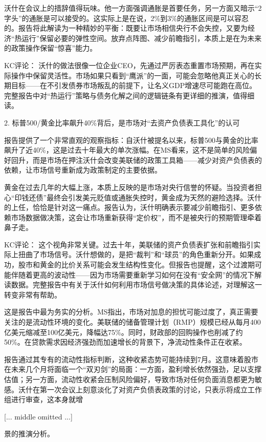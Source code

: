 \documentclass[11pt]{ctexart}
\begin{document}
沃什在会议上的措辞值得玩味。他一方面强调通胀是首要任务，另一方面又暗示“2字头”的通胀是可以接受的。这实际上是在说，2\%到3\%的通胀区间是可以容忍的。报告将此解读为一种精妙的平衡：既要让市场相信央行不会失控，又要为经济“热运行”保留必要的弹性空间。放弃点阵图、减少前瞻指引，本质上是在为未来的政策操作保留“惊喜”能力。

KC评论： 沃什的做法很像一位企业CEO，先通过严厉表态重置市场预期，再在实际操作中保留灵活性。市场如果只看到“鹰派”的一面，可能会忽略他真正关心的长期目标——在不引发债券市场叛乱的前提下，让名义GDP增速尽可能跑在高位。完整报告中对“热运行”策略与债务化解之间的逻辑链条有更详细的推演，值得细读。

2. 标普500/黄金比率飙升40\%背后，是市场对“去资产负债表工具化”的认可

报告提供了一个非常直观的观察指标：自沃什被提名以来，标普500与黄金的比率飙升了近40\%，这是过去十年最大的单次涨幅。在MS看来，这不是简单的风险偏好回升，而是市场在押注沃什会改变美联储的政策工具箱——减少对资产负债表的依赖，让市场信号重新成为政策制定的主要依据。

黄金在过去几年的大幅上涨，本质上反映的是市场对央行信誉的怀疑。当投资者担心“印钱还债”最终会引发美元贬值或通胀失控时，黄金成为天然的避险选择。沃什的上任，恰恰是针对这一痛点。报告认为，沃什明确表示要减少前瞻指引、更多依赖市场数据做决策，这会让市场重新获得“定价权”，而不是被央行的预期管理牵着鼻子走。

KC评论： 这个视角非常关键。过去十年，美联储的资产负债表扩张和前瞻指引实际上扭曲了市场信号。沃什想做的，是把“裁判”和“球员”的角色重新分开。如果成功，股市和黄金的比价关系可能会发生结构性变化。但报告也提醒，这个过渡期可能伴随着更高的波动性——因为市场需要重新学习如何在没有“安全网”的情况下解读数据。完整报告中有关于沃什如何利用市场信号做决策的具体论述，对理解这一转变非常有帮助。

这是报告中最为务实的分析。MS指出，市场对加息的担忧可能过度了，真正需要关注的是流动性环境的变化。美联储的储备管理计划（RMP）规模已经从每月400亿美元缩减至100亿美元，降幅达75\%。同时，财政部的回购操作也削减了约50\%。在贷款需求因经济强劲而加速增长的背景下，净流动性条件正在收紧。

报告通过其专有的流动性指标判断，这种收紧态势可能持续到7月。这意味着股市在未来几个月将面临一个“双刃剑”的局面：一方面，盈利增长依然强劲，足以支撑估值；另一方面，流动性收紧会压制风险偏好，导致市场对任何负面消息都更为敏感。沃什在第一次会议上刻意淡化了对资产负债表政策的讨论，只表示将成立工作组进行审查，这本身就增

[... middle omitted ...]

景的推演分析。
\end{document}
